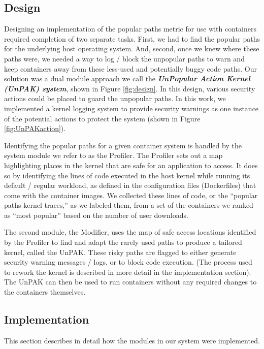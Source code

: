 \subsection{Design}
\label{sec.design.design}

Designing an implementation of the popular paths metric for use with containers required completion of two separate tasks. 
First, we had to find the popular paths for the underlying host operating system. 
And, second, once we knew where these paths were, we needed a way to log / block the unpopular paths to warn and keep containers away from these less-used and potentially buggy code paths. Our solution was a dual module approach we call the \textbf{\textit{UnPopular Action Kernel (UnPAK) system}}, shown in Figure \ref{fig:design}. In this design, 
various security actions could be placed to guard the unpopular paths. In this work, we implemented a kernel logging system to provide security warnings as one instance of the 
potential actions to protect the system (shown in Figure \ref{fig:UnPAKaction}). 

Identifying the popular paths for a given container system is handled by the system module we refer to as the Profiler. 
The Profiler sets out a map highlighting places in the kernel that are safe for an application to access. 
It does so by identifying the lines of code executed  in the host kernel while running its default / regular workload, 
as defined in the configuration files (Dockerfiles) that come with the container images. We collected these lines of code, or the ``popular paths kernel traces,'' as we labeled them, 
from a set of the containers we ranked as “most popular” based on the number of user downloads. 

The second module, the Modifier, uses the map of safe access locations identified by the Profiler to find and adapt the rarely used paths to produce a tailored kernel, called the UnPAK. 
These risky paths are flagged to either generate security warning messages / logs, or to block code execution. 
(The process used to rework the kernel is described in more detail in the implementation section). 
The UnPAK can then be used to run containers without any required changes to the containers themselves.

\subsection{Implementation}
\label{sec.design.implementation}
This section describes in detail how the modules in our system were implemented.

